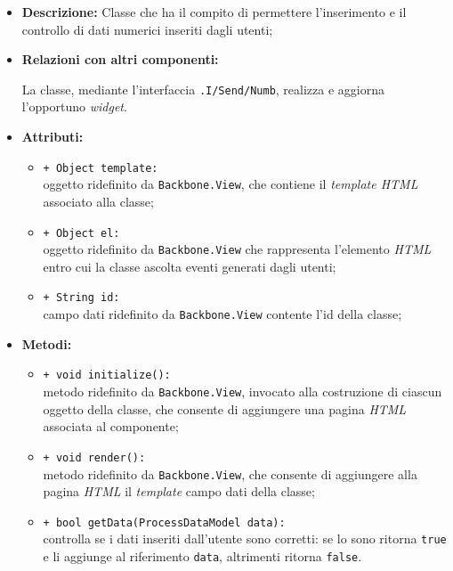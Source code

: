 \begin{flushleft}
\begin{itemize}
\item \textbf{Descrizione:} Classe che ha il compito di permettere l'inserimento e il controllo di dati numerici inseriti dagli utenti;
\item \textbf{Relazioni con altri componenti:}
\begin{sloppypar}
La classe, mediante l'interfaccia \texttt{\viewUser{}.I\fshyp{}Send\fshyp{}Numb}, realizza e aggiorna l'opportuno \textit{widget}.
\end{sloppypar}
\item \textbf{Attributi:}
\begin{sloppypar}
\begin{itemize}
\item \texttt{+ Object template:}\\ oggetto ridefinito da \texttt{Backbone.View}, che contiene il \textit{template HTML} associato alla classe;
\item \texttt{+ Object el:}\\ oggetto ridefinito da \texttt{Backbone.View} che rappresenta l'elemento \textit{HTML} entro cui la classe ascolta eventi generati dagli utenti;
\item \texttt{+ String id:}\\ campo dati ridefinito da \texttt{Backbone.View} contente l'id della classe;
\end{itemize}
\end{sloppypar}
\item \textbf{Metodi:}
\begin{sloppypar}
\begin{itemize}
\item \texttt{+ void initialize():}\\ metodo ridefinito da \texttt{Backbone.View}, invocato alla costruzione di ciascun oggetto della classe, che consente di aggiungere una pagina \textit{HTML} associata al componente;
\item \texttt{+ void render():}\\ metodo ridefinito da \texttt{Backbone.View}, che consente di aggiungere alla pagina \textit{HTML} il \textit{template} campo dati della classe;
\item \texttt{+ bool getData(ProcessDataModel data):}\\ controlla se i dati inseriti dall'utente sono corretti: se lo sono ritorna \texttt{true} e li aggiunge al riferimento \texttt{data}, altrimenti ritorna \texttt{false}.
\end{itemize}
\end{sloppypar}
\end{itemize}
\end{flushleft}

